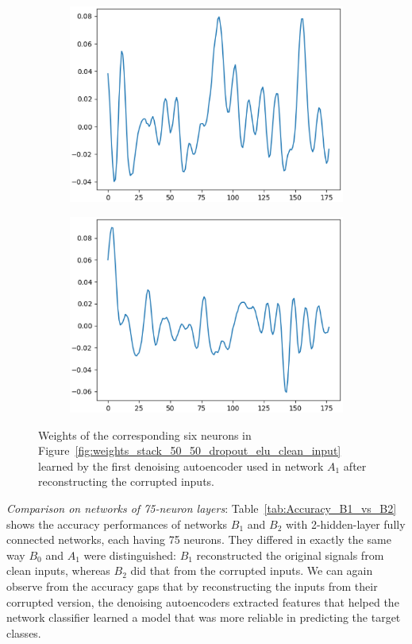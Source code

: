 \documentclass[12pt]{article}
\begin{document}
\begin{figure}
\begin{subfigure}{.5\textwidth}
  \centering
  \includegraphics[width=.8\linewidth]{figures/stack_50_50_dropout_elu/weights_neuron_4.eps}
\end{subfigure}
\begin{subfigure}{.5\textwidth}
  \centering
  \includegraphics[width=.8\linewidth]{figures/stack_50_50_dropout_elu/weights_neuron_8.eps}
\end{subfigure}
\caption{Weights of the corresponding six neurons in Figure~\ref{fig:weights_stack_50_50_dropout_elu_clean_input} learned by the first denoising autoencoder used in network $A_1$ after reconstructing the corrupted inputs.}
\label{fig:weights_stack_50_50_dropout_elu}
\end{figure}

\textit{Comparison on networks of 75-neuron layers}: Table~\ref{tab:Accuracy_B1_vs_B2} shows the accuracy performances of networks $B_1$ and $B_2$ with 2-hidden-layer fully connected networks, each having 75 neurons. They differed in exactly the same way $B_0$ and $A_1$ were distinguished: $B_1$ reconstructed the original signals from clean inputs, whereas $B_2$ did that from the corrupted inputs. We can again observe from the accuracy gaps that by reconstructing the inputs from their corrupted version, the denoising autoencoders extracted features that helped the network classifier learned a model that was more reliable in predicting the target classes.
\end{document}
